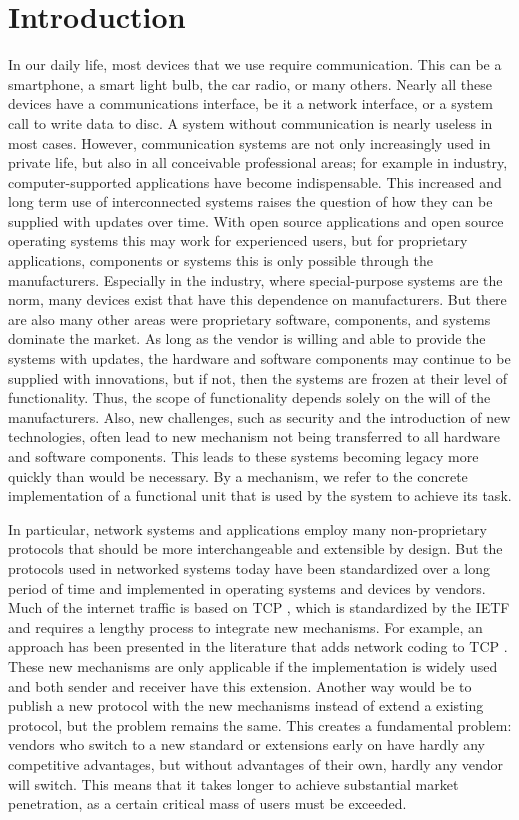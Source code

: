 \section{Introduction}
\label{sec:intro}

In our daily life, most devices that we use require communication. 
This can be a smartphone, a smart light bulb, the car radio, or many others.
Nearly all these devices have a communications interface, be it a network interface, or a system call to write data to disc. 
A system without communication is nearly useless in most cases. 
However, communication systems are not only increasingly used in private life, but also in all conceivable professional areas; for example in industry, computer-supported applications have become indispensable.  
This increased and long term use of interconnected systems raises the question of how they can be supplied with updates over time. 
With open source applications and open source operating systems this may work for experienced users, but for proprietary applications, components or systems this is only possible through the manufacturers.
Especially in the industry, where special-purpose systems are the norm, many devices exist that have this dependence on manufacturers. 
But there are also many other areas were proprietary software, components, and systems dominate the market.
As long as the vendor is willing and able to provide the systems with updates, the hardware and software components may continue to be supplied with innovations, but if not, then the systems are frozen at their level of functionality. 
Thus, the scope of functionality depends solely on the will of the manufacturers.
Also, new challenges, such as security and the introduction of new technologies, often lead to new mechanism not being transferred to all hardware and software components. 
This leads to these systems becoming legacy more quickly than would be necessary. 
By a mechanism, we refer to the concrete implementation of a functional unit that is used by the system to achieve its task. 

In particular, network systems and applications employ many non-proprietary protocols that should be more interchangeable and extensible by design. 
But the protocols used in networked systems today have been standardized over a long period of time and implemented in operating systems and devices by vendors.
Much of the internet traffic is based on TCP  \cite{A3:john2007analysis}, which is standardized by the IETF and requires a lengthy process to integrate new mechanisms\cite{A3:de2019pluginizing}. 
For example, an approach has been presented in the literature that adds network coding to TCP \cite{A3:sundararajan2011network}. 
These new mechanisms are only applicable if the implementation is widely used and both sender and receiver have this extension. 
Another way would be to publish a new protocol with the new mechanisms instead of extend a existing protocol, but the problem remains the same. 
This creates a fundamental problem: vendors who switch to a new standard or extensions early on have hardly any competitive advantages, but without advantages of their own, hardly any vendor will switch.
This means that it takes longer to achieve substantial market penetration, as a certain critical mass of users must be exceeded. 

